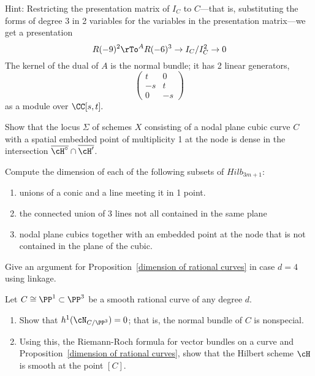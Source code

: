 Hint: Restricting the presentation matrix of $I_C$ to $C$---that is, substituting the forms of degree 3 in 2 variables for the variables in the presentation matrix---we get a presentation 
$$
R(-9)^2 \rTo^A R(-6)^3 \to I_C/I_C^2 \to 0 
$$
The kernel of the dual of $A$ is the normal bundle; it has 2 linear generators, 
$$
\begin{pmatrix}
t&0\\
-s&t\\
0&-s
\end{pmatrix}
$$
as a module over $\CC[s,t].$


\begin{exercise}\label{hilb intersection}
Show that the locus $\Sigma$ of schemes $X$ consisting of a nodal plane cubic curve $C$ with a spatial embedded point of multiplicity 1 at the node is dense in the intersection $\overline{\cH^\circ} \cap \overline{\cH'}$.
\end{exercise}

\begin{exercise}
 Compute the dimension of each of the following subsets of $Hilb_{3m+1}$:
 
\begin{enumerate}
 \item unions of a conic and a line meeting it in 1 point.
 \item the connected union of 3 lines not all contained in the same plane
 \item nodal plane cubics together with an embedded point at the node that is not contained in the plane of
 the cubic.
\end{enumerate}
\end{exercise}

\begin{exercise}
Give an argument for Proposition~\ref{dimension of rational curves} in case $d=4$ using linkage. 
\end{exercise}
\begin{exercise}
Let $C \cong \PP^1 \subset \PP^3$ be a smooth rational curve of any degree $d$. 
\begin{enumerate}
\item Show that $h^1(\cN_{C/\PP^3}) = 0$; that is, the normal bundle of $C$ is nonspecial.
\item Using this, the Riemann-Roch formula for vector bundles on a curve and Proposition~\ref{dimension of rational curves}, show that the Hilbert scheme $\cH$ is smooth at the point $[C]$.
\end{enumerate} 
\end{exercise}

